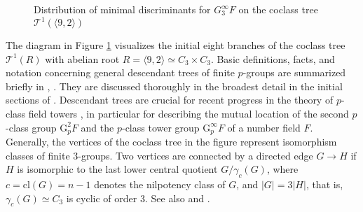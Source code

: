 \documentclass{amsart}
\theoremstyle{definition}
\numberwithin{equation}{section}
\begin{document}



\begin{figure}[ht]
\caption{Distribution of minimal discriminants for \(G_3^\infty{F}\) on the coclass tree \(\mathcal{T}^1(\langle 9,2\rangle)\)}
\label{fig:MinDscTreeCc1}



\end{figure}


The diagram in Figure
\ref{fig:MinDscTreeCc1}
visualizes the initial eight branches of the coclass tree \(\mathcal{T}^1(R)\)
with abelian root \(R=\langle 9,2\rangle\simeq C_3\times C_3\).
Basic definitions, facts, and notation concerning general descendant trees of finite \(p\)-groups
are summarized briefly in
\cite[\S\ 2, pp. 410--411]{Ma4},
\cite{Ma4a}.
They are discussed thoroughly in the broadest detail in the initial sections of
\cite{Ma6}.
Descendant trees are crucial for recent progress in the theory of \(p\)-class field towers
\cite{Ma13,Ma15,Ma15b},
in particular for describing the mutual location of
the second \(p\)-class group \(\mathrm{G}_p^2{F}\) and the \(p\)-class tower group \(\mathrm{G}_p^\infty{F}\)
of a number field \(F\).
Generally, the vertices of the coclass tree in the figure
represent isomorphism classes of finite \(3\)-groups.
Two vertices are connected by a directed edge \(G\to H\) if
\(H\) is isomorphic to the last lower central quotient \(G/\gamma_c(G)\),
where \(c=\mathrm{cl}(G)=n-1\) denotes the nilpotency class of \(G\),
and \(\lvert G\rvert=3\lvert H\rvert\), that is,
\(\gamma_c(G)\simeq C_3\) is cyclic of order \(3\).
See also
\cite[\S\ 2.2, p. 410--411]{Ma4}
and
\cite[\S\ 4, p. 163--164]{Ma6}.
\end{document}
